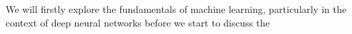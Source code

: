 We will firstly explore the fundamentals of machine learning, particularly in the context of deep neural networks before we start to discuss the 